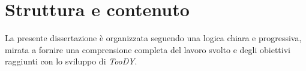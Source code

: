 \documentclass[12pt]{report}
\newcommand{\toody}{\textsl{TooDY}\xspace}
\begin{document}






\section{Struttura e contenuto}
La presente dissertazione è organizzata seguendo una logica chiara e progressiva, mirata a fornire una comprensione completa del lavoro svolto e degli obiettivi raggiunti con lo sviluppo di \toody.
\end{document}
